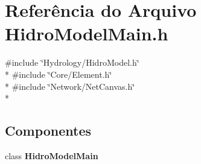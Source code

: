 \section{Referência do Arquivo Hidro\+Model\+Main.\+h}
\label{_hidro_model_main_8h}
{\ttfamily \#include \char`\"{}Hydrology/\+Hidro\+Model.\+h\char`\"{}}\\*
{\ttfamily \#include \char`\"{}Core/\+Element.\+h\char`\"{}}\\*
{\ttfamily \#include \char`\"{}Network/\+Net\+Canvas.\+h\char`\"{}}\\*
\subsection*{Componentes}
\begin{DoxyCompactItemize}
\item 
class {\bf Hidro\+Model\+Main}
\end{DoxyCompactItemize}
